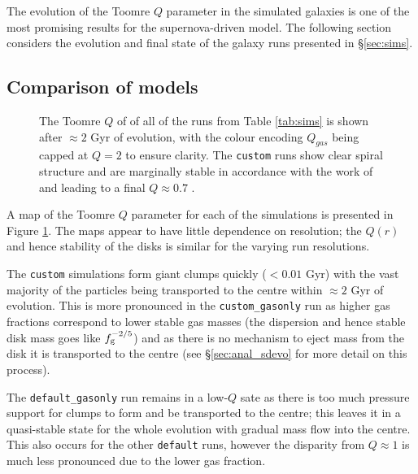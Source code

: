 The evolution of the Toomre $Q$ parameter in the simulated galaxies is one of the most promising results for the supernova-driven model.
The following section considers the evolution and final state of the galaxy runs presented in \S \ref{sec:sims}.

\subsection{Comparison of models}

\begin{figure}[!ht]
    \leavevmode\rlap{\usebox{\graphicsbox}}%
    \begin{minipage}[b]{0.63\wd\graphicsbox}%
        \caption{The Toomre $Q$ of of all of the runs from Table \ref{tab:sims} is shown after $\approx 2$ Gyr of evolution, with the colour encoding $Q_{gas}$ being capped at $Q=2$ to ensure clarity. The {\tt custom} runs show clear spiral structure and are marginally stable in accordance with the work of \citet{hopkins_stellar_2012} and \citep{behrendt_structure_2015} leading to a final $Q \approx 0.7$ .}
        \label{fig:toomqsimbigfig}
    \end{minipage}\hspace*{0.33\wd\graphicsbox}%
\end{figure}

A map of the Toomre $Q$ parameter for each of the simulations is presented in Figure \ref{fig:toomqsimbigfig}.
The maps appear to have little dependence on resolution; the $Q(r)$ and hence stability of the disks is similar for the varying run resolutions.

The {\tt custom} simulations form giant clumps quickly ($<0.01$ Gyr) with the vast majority of the particles being transported to the centre within $\approx 2$ Gyr of evolution.
This is more pronounced in the {\tt custom\_gasonly} run as higher gas fractions correspond to lower stable gas masses (the dispersion and hence stable disk mass goes like $f_\mathrm{g}^{-2/5}$) and as there is no mechanism to eject mass from the disk it is transported to the centre (see \S \ref{sec:anal_sdevo} for more detail on this process).

The {\tt default\_gasonly} run remains in a low-$Q$ sate as there is too much pressure support for clumps to form and be transported to the centre; this leaves it in a quasi-stable state for the whole evolution with gradual mass flow into the centre.
This also occurs for the other {\tt default} runs, however the disparity from $Q \approx 1$ is much less pronounced due to the lower gas fraction.

